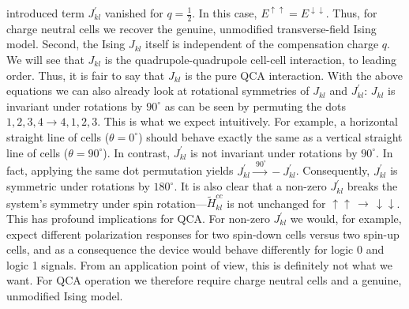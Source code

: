 introduced term $J^{\prime}_{kl}$ vanished for $q=\frac{1}{2}$. In this case,
$E^{\uparrow\uparrow} = E^{\downarrow\downarrow}$. Thus, for charge neutral
cells we recover the genuine, unmodified transverse-field Ising model. Second,
the Ising $J_{kl}$ itself is independent of the compensation charge $q$. We
will see that $J_{kl}$ is the quadrupole-quadrupole cell-cell interaction, to
leading order. Thus, it is fair to say that $J_{kl}$ is the pure QCA
interaction. With the above equations we can also already look at rotational
symmetries of $J_{kl}$ and $J^{\prime}_{kl}$: $J_{kl}$ is invariant under
rotations by $90^{\circ}$ as can be seen by permuting the dots $1,2,3,4
\rightarrow 4,1,2,3$. This is what we expect intuitively. For example, a
horizontal straight line of cells ($\theta = 0^{\circ}$) should behave exactly
the same as a vertical straight line of cells ($\theta = 90^{\circ}$). In
contrast, $J^{\prime}_{kl}$ is not invariant under rotations by $90^{\circ}$. In
fact, applying the same dot permutation yields $J^{\prime}_{kl}
\xrightarrow{\,\, 90^{\circ}} - J^{\prime}_{kl}$. Consequently,
$J^{\prime}_{kl}$ is symmetric under rotations by $180^{\circ}$. It is also
clear that a non-zero $J^{\prime}_{kl}$ breaks the system's symmetry under spin
rotation---$\tilde{H}^{cc}_{kl}$ is not unchanged for $\uparrow\uparrow \,
\rightarrow \, \downarrow\downarrow$. This has profound implications for QCA.
For non-zero $J^{\prime}_{kl}$ we would, for example, expect different
polarization responses for two spin-down cells versus two spin-up cells, and as
a consequence the device would behave differently for logic 0 and logic 1
signals. From an application point of view, this is definitely not what we want.
For QCA operation we therefore require charge neutral cells and a genuine,
unmodified Ising model.

